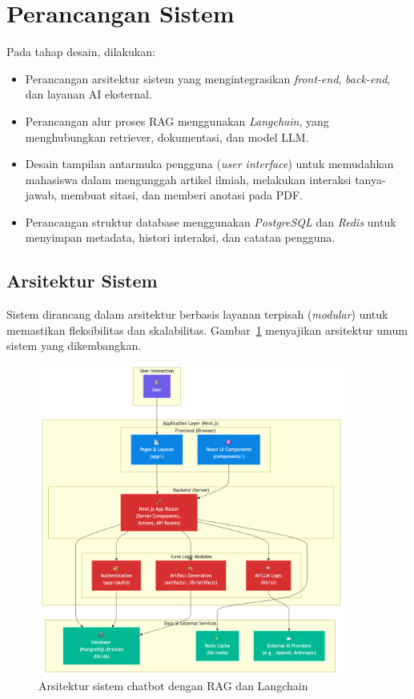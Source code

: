 \section{Perancangan Sistem}
Pada tahap desain, dilakukan:
\begin{itemize}
  \item Perancangan arsitektur sistem yang mengintegrasikan \textit{front-end}, \textit{back-end}, dan layanan AI eksternal.
  \item Perancangan alur proses RAG menggunakan \textit{Langchain}, yang menghubungkan retriever, dokumentasi, dan model LLM.
  \item Desain tampilan antarmuka pengguna (\textit{user interface}) untuk memudahkan mahasiswa dalam mengunggah artikel ilmiah, melakukan interaksi tanya-jawab, membuat sitasi, dan memberi anotasi pada PDF.
  \item Perancangan struktur database menggunakan \emph{PostgreSQL} dan \emph{Redis} untuk menyimpan metadata, histori interaksi, dan catatan pengguna.
\end{itemize}

\subsection{Arsitektur Sistem}
Sistem dirancang dalam arsitektur berbasis layanan terpisah (\textit{modular}) untuk memastikan fleksibilitas dan skalabilitas. Gambar~\ref{fig:arsitektur-sistem} menyajikan arsitektur umum sistem yang dikembangkan.

\begin{figure}[H]
  \centering
  \includegraphics[width=0.9\textwidth]{images/system-arch.png}
  \caption{Arsitektur sistem chatbot dengan RAG dan Langchain}
  \label{fig:arsitektur-sistem}
\end{figure}

